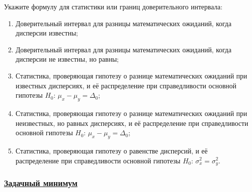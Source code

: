 Укажите формулу для статистики или границ доверительного интервала:

\begin{enumerate}[resume]
  \item Доверительный интервал для разницы математических ожиданий, когда дисперсии известны;
  \item Доверительный интервал для разницы математических ожиданий, когда дисперсии не известны, но равны;
  \item Статистика, проверяющая гипотезу о разнице математических ожиданий при известных дисперсиях,
    и её распределение при справедливости основной гипотезы $H_0$: $\mu_x - \mu_y = \Delta_0$;
  \item Статистика, проверяющая гипотезу о разнице математических ожиданий при неизвестных, но равных дисперсиях,
    и её распределение при справедливости основной гипотезы $H_0$: $\mu_x - \mu_y = \Delta_0$;
  \item Статистика, проверяющая гипотезу о равенстве дисперсий,
    и её распределение при справедливости основной гипотезы $H_0$: $\sigma^2_x = \sigma^2_y$.
\end{enumerate}


\newpage
\subsubsection*{\hyperref[sec:sol_minimum_kr_04]{Задачный минимум}}
\label{sec:minimum_kr_04}


